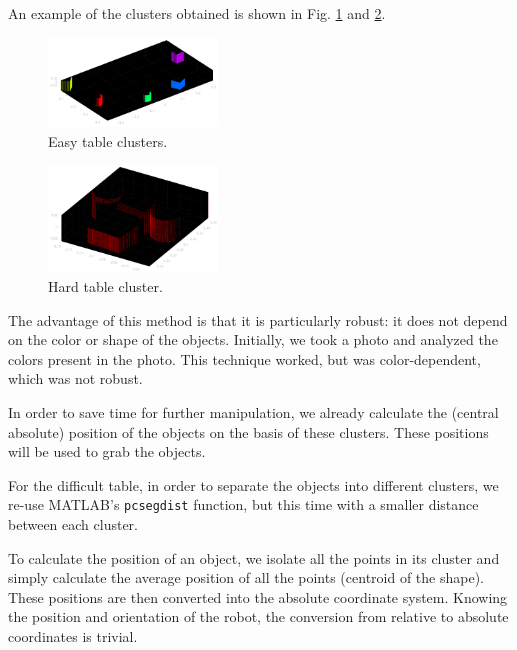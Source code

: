 \documentclass[a4paper, 10pt, conference]{ieeeconf}
\begin{document}
    An example of the clusters obtained is shown in Fig. \ref{fig:manipulation.clusters.easy} and \ref{fig:manipulation.clusters.hard}.
    
    \begin{figure}[!h]
        \centering
        \includegraphics[width=0.4\textwidth]{resources/png/clusters-easy.png}
        \caption{Easy table clusters.}
        \label{fig:manipulation.clusters.easy}
    \end{figure}
    
    \begin{figure}[!h]
        \centering
        \includegraphics[width=0.4\textwidth]{resources/png/clusters-hard.png}
        \caption{Hard table cluster.}
        \label{fig:manipulation.clusters.hard}
    \end{figure}
    
    The advantage of this method is that it is particularly robust: it does not depend on the color or shape of the objects. Initially, we took a photo and analyzed the colors present in the photo. This technique worked, but was color-dependent, which was not robust.
    
    In order to save time for further manipulation, we already calculate the (central absolute) position of the objects on the basis of these clusters. These positions will be used to grab the objects.
    
    For the difficult table, in order to separate the objects into different clusters, we re-use MATLAB's \texttt{pcsegdist} function, but this time with a smaller distance between each cluster.
    
    To calculate the position of an object, we isolate all the points in its cluster and simply calculate the average position of all the points (centroid of the shape). These positions are then converted into the absolute coordinate system. Knowing the position and orientation of the robot, the conversion from relative to absolute coordinates is trivial.
    
\end{document}
